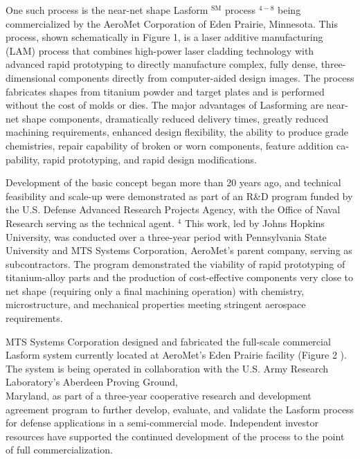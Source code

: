 \documentclass[10pt]{article}
\begin{document}
One such process is the near-net shape Lasform $^{\mathrm{SM}}$ process $^{4-8}$ being commercialized by the AeroMet Corporation of Eden Prairie, Minnesota. This process, shown schematically in Figure 1, is a laser additive manufacturing (LAM) process that combines high-power laser cladding technology with advanced rapid prototyping to directly manufacture complex, fully dense, three-dimensional components directly from computer-aided design images. The process fabricates shapes from titanium powder and target plates and is performed without the cost of molds or dies. The major advantages of Lasforming are near-net shape components, dramatically reduced delivery times, greatly reduced machining requirements, enhanced design flexibility, the ability to produce grade chemistries, repair capability of broken or worn components, feature addition ca- pability, rapid prototyping, and rapid design modifications.

Development of the basic concept began more than 20 years ago, and technical feasibility and scale-up were demonstrated as part of an R\&D program funded by the U.S. Defense Advanced Research Projects Agency, with the Office of Naval Research serving as the technical agent. ${ }^{4}$ This work, led by Johns Hopkins University, was conducted over a three-year period with Pennsylvania State University and MTS Systems Corporation, AeroMet's parent company, serving as subcontractors. The program demonstrated the viability of rapid prototyping of titanium-alloy parts and the production of cost-effective components very close to net shape (requiring only a final machining operation) with chemistry, microstructure, and mechanical properties meeting stringent aerospace requirements.

MTS Systems Corporation designed and fabricated the full-scale commercial Lasform system currently located at AeroMet's Eden Prairie facility (Figure 2 ). The system is being operated in collaboration with the U.S. Army Research Laboratory's Aberdeen Proving Ground,\\
Maryland, as part of a three-year cooperative research and development agreement program to further develop, evaluate, and validate the Lasform process for defense applications in a semi-commercial mode. Independent investor resources have supported the continued development of the process to the point of full commercialization.
\end{document}
